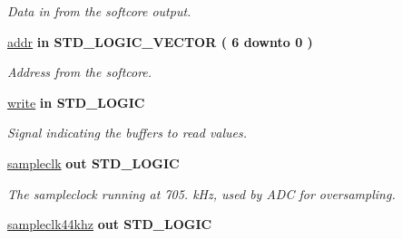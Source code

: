 \begin{DoxyCompactItemize}
\begin{DoxyCompactList}\small\item\em Data in from the softcore output. \end{DoxyCompactList}\item 
\hypertarget{classdacTop_ad1620b7fc57dbb860b23d27c24034285}{\hyperlink{classdacTop_ad1620b7fc57dbb860b23d27c24034285}{addr}  {\bfseries {\bfseries \textcolor{vhdlkeyword}{in}\textcolor{vhdlchar}{ }}} {\bfseries \textcolor{comment}{S\-T\-D\-\_\-\-L\-O\-G\-I\-C\-\_\-\-V\-E\-C\-T\-O\-R}\textcolor{vhdlchar}{ }\textcolor{vhdlchar}{(}\textcolor{vhdlchar}{ }\textcolor{vhdlchar}{ } \textcolor{vhdldigit}{6} \textcolor{vhdlchar}{ }\textcolor{vhdlchar}{ }\textcolor{vhdlchar}{ }\textcolor{vhdlkeyword}{downto}\textcolor{vhdlchar}{ }\textcolor{vhdlchar}{ }\textcolor{vhdlchar}{ } \textcolor{vhdldigit}{0} \textcolor{vhdlchar}{ }\textcolor{vhdlchar}{)}\textcolor{vhdlchar}{ }} }\label{classdacTop_ad1620b7fc57dbb860b23d27c24034285}

\begin{DoxyCompactList}\small\item\em Address from the softcore. \end{DoxyCompactList}\item 
\hypertarget{classdacTop_a042a830e6d62a56ff50a9a3e85ff86dd}{\hyperlink{classdacTop_a042a830e6d62a56ff50a9a3e85ff86dd}{write}  {\bfseries {\bfseries \textcolor{vhdlkeyword}{in}\textcolor{vhdlchar}{ }}} {\bfseries \textcolor{comment}{S\-T\-D\-\_\-\-L\-O\-G\-I\-C}\textcolor{vhdlchar}{ }} }\label{classdacTop_a042a830e6d62a56ff50a9a3e85ff86dd}

\begin{DoxyCompactList}\small\item\em Signal indicating the buffers to read values. \end{DoxyCompactList}\item 
\hypertarget{classdacTop_aae112fd9041e6fcce9483ea8550d54f3}{\hyperlink{classdacTop_aae112fd9041e6fcce9483ea8550d54f3}{sampleclk}  {\bfseries {\bfseries \textcolor{vhdlkeyword}{out}\textcolor{vhdlchar}{ }}} {\bfseries \textcolor{comment}{S\-T\-D\-\_\-\-L\-O\-G\-I\-C}\textcolor{vhdlchar}{ }} }\label{classdacTop_aae112fd9041e6fcce9483ea8550d54f3}

\begin{DoxyCompactList}\small\item\em The sampleclock running at 705. k\-Hz, used by A\-D\-C for oversampling. \end{DoxyCompactList}\item 
\hypertarget{classdacTop_a70a8575229cff595728858aea9bd6a65}{\hyperlink{classdacTop_a70a8575229cff595728858aea9bd6a65}{sampleclk44khz}  {\bfseries {\bfseries \textcolor{vhdlkeyword}{out}\textcolor{vhdlchar}{ }}} {\bfseries \textcolor{comment}{S\-T\-D\-\_\-\-L\-O\-G\-I\-C}\textcolor{vhdlchar}{ }} }\label{classdacTop_a70a8575229cff595728858aea9bd6a65}


\end{DoxyCompactItemize}
